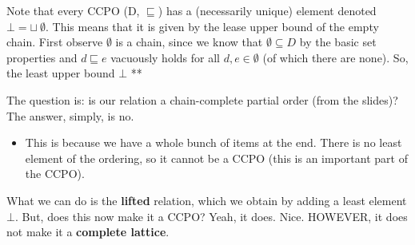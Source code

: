 \documentclass[11pt,a4paper,titlepage,dvipsnames,cmyk]{scrartcl}
\begin{document}
Note that every CCPO (D, $\sqsubseteq$) has a (necessarily unique) element
denoted $\bot = \sqcup \ \emptyset$. This means that it is given by the
lease upper bound of the empty chain. First observe $\emptyset$ is a
chain, since we know that $\emptyset \subseteq D$ by the basic set
properties and $d \sqsubseteq e$ vacuously holds for all $d,e \in
\emptyset$ (of which there are none). So, the least upper bound $\bot$ **

The question is: is our relation a chain-complete partial order (from the
slides)? The answer, simply, is no.
\begin{itemize}
    \item This is because we have a whole bunch of items at the end. There
        is no least element of the ordering, so it cannot be a CCPO (this
        is an important part of the CCPO).
\end{itemize}

What we can do is the \textbf{lifted} relation, which we obtain by adding
a least element $\bot$. But, does this now make it a CCPO? Yeah, it does.
Nice. HOWEVER, it does not make it a \textbf{complete lattice}.
\end{document}
